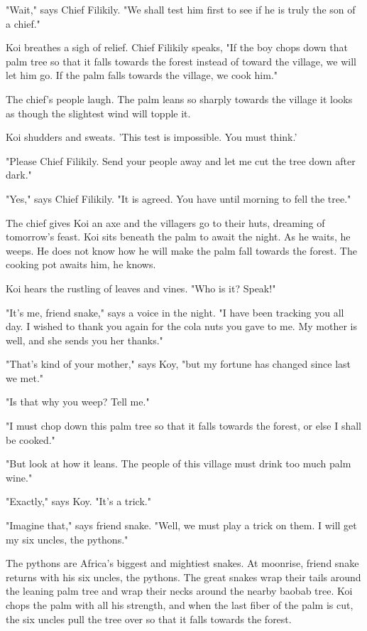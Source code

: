"Wait," says Chief Filikily. "We shall test him first to see if he is truly the son of a chief."

Koi breathes a sigh of relief. Chief Filikily speaks, "If the boy chops down that palm tree so that it falls towards the forest instead of toward the village, we will let him go. If the palm falls towards the village, we cook him."

The chief's people laugh. The palm leans so sharply towards the village it looks as though the slightest wind will topple it.

Koi shudders and sweats. 'This test is impossible. You must think.'

"Please Chief Filikily. Send your people away and let me cut the tree down after dark."

"Yes," says Chief Filikily. "It is agreed. You have until morning to fell the tree."

The chief gives Koi an axe and the villagers go to their huts, dreaming of tomorrow's feast. Koi sits beneath the palm to await the night. As he waits, he weeps. He does not know how he will make the palm fall towards the forest. The cooking pot awaits him, he knows.

Koi hears the rustling of leaves and vines. "Who is it? Speak!"

"It's me, friend snake," says a voice in the night. "I have been tracking you all day. I wished to thank you again for the cola nuts you gave to me. My mother is well, and she sends you her thanks."

"That's kind of your mother," says Koy, "but my fortune has changed since last we met."

"Is that why you weep? Tell me."

"I must chop down this palm tree so that it falls towards the forest, or else I shall be cooked."

"But look at how it leans. The people of this village must drink too much palm wine."

"Exactly," says Koy. "It's a trick."

"Imagine that," says friend snake. "Well, we must play a trick on them. I will get my six uncles, the pythons."

The pythons are Africa's biggest and mightiest snakes. At moonrise, friend snake returns with his six uncles, the pythons. The great snakes wrap their tails around the leaning palm tree and wrap their necks around the nearby baobab tree. Koi chops the palm with all his strength, and when the last fiber of the palm is cut, the six uncles pull the tree over so that it falls towards the forest.

